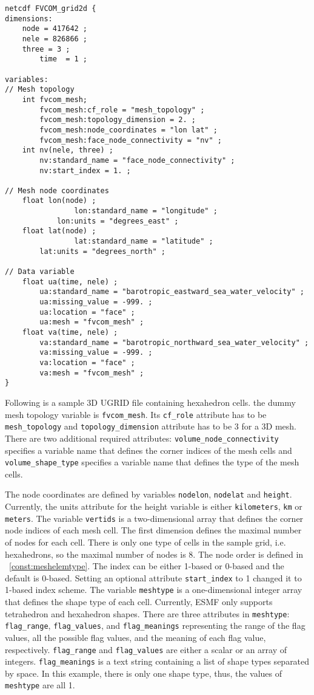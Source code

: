\begin{verbatim}
netcdf FVCOM_grid2d {
dimensions:
	node = 417642 ;
	nele = 826866 ;
	three = 3 ;
        time  = 1 ;

variables:
// Mesh topology
	int fvcom_mesh;
		fvcom_mesh:cf_role = "mesh_topology" ;
		fvcom_mesh:topology_dimension = 2. ;
		fvcom_mesh:node_coordinates = "lon lat" ;
		fvcom_mesh:face_node_connectivity = "nv" ;
	int nv(nele, three) ;
		nv:standard_name = "face_node_connectivity" ;
		nv:start_index = 1. ;

// Mesh node coordinates
	float lon(node) ;
                lon:standard_name = "longitude" ;
	        lon:units = "degrees_east" ;
	float lat(node) ;
                lat:standard_name = "latitude" ;
		lat:units = "degrees_north" ;

// Data variable
	float ua(time, nele) ;
		ua:standard_name = "barotropic_eastward_sea_water_velocity" ;
		ua:missing_value = -999. ;
		ua:location = "face" ;
		ua:mesh = "fvcom_mesh" ;
	float va(time, nele) ;
		va:standard_name = "barotropic_northward_sea_water_velocity" ;
		va:missing_value = -999. ;
		va:location = "face" ;
		va:mesh = "fvcom_mesh" ;
}
\end{verbatim}

Following is a sample 3D UGRID file containing hexahedron cells. the dummy mesh topology variable is {\tt fvcom\_mesh}. Its {\tt cf\_role} attribute has to be {\tt mesh\_topology}
and {\tt topology\_dimension} attribute has to be 3 for a 3D mesh.  There are two additional required attributes:
{\tt volume\_node\_connectivity} specifies a variable name that defines the corner indices of the mesh cells and
{\tt volume\_shape\_type} specifies a variable name that defines the type of the mesh cells.

The node coordinates are defined by variables {\tt nodelon}, {\tt nodelat} and {\tt height}. Currently, the units
attribute for the height variable is either {\tt kilometers}, {\tt km} or {\tt meters}.
The variable {\tt vertids} is a two-dimensional array that defines the corner node indices of each mesh cell. The first dimension
defines the maximal number of nodes for each cell. There is only one type of cells in the sample grid, i.e. hexahedrons, so the maximal number
of nodes is 8.  The node order is defined in ~\ref{const:meshelemtype}.  The index can be either 1-based or 0-based and
the default is 0-based.
 Setting an optional attribute {\tt start\_index} to 1 changed it to 1-based index scheme.
The variable {\tt meshtype} is a one-dimensional integer array that defines the shape type of each cell.  Currently, ESMF only
supports tetrahedron and hexahedron shapes. There are three attributes in {\tt meshtype}: {\tt flag\_range}, {\tt flag\_values}, and {\tt flag\_meanings} representing the range of the flag values, all the possible flag values, and the meaning of each flag value, respectively.  {\tt flag\_range} and {\tt flag\_values} are either a scalar or an array of integers.  {\tt flag\_meanings} is a text string containing a list of shape types separated by space. In this example, there
is only one shape type, thus, the values of {\tt meshtype} are all 1.


